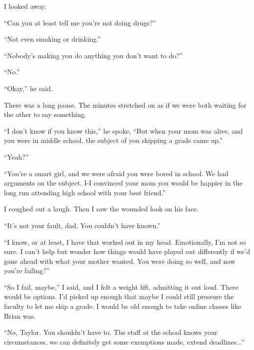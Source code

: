 I looked away.



``Can you at least tell me you're not doing drugs?''



``Not even smoking or drinking.''



``Nobody's making you do anything you don't want to do?''



``No.''



``Okay,'' he said.



There was a long pause.  The minutes stretched on as if we were both waiting for the other to say something.



``I don't know if you know this,'' he spoke, ``But when your mom was alive, and you were in middle school, the subject of you skipping a grade came up.''



``Yeah?''



``You're a smart girl, and we were afraid you were bored in school.  We had arguments on the subject.  I-I convinced your mom you would be happier in the long run attending high school with your best friend.''



I coughed out a laugh.  Then I saw the wounded look on his face.



``It's not your fault, dad.  You couldn't have known.''



``I know, or at least, I have that worked out in my head.  Emotionally, I'm not so sure.  I can't help but wonder how things would have played out differently if we'd gone ahead with what your mother wanted.  You were doing so well, and now you're failing?''



``So I fail, maybe,'' I said, and I felt a weight lift, admitting it out loud.  There would be options.  I'd picked up enough that maybe I could still pressure the faculty to let me skip a grade.  I would be old enough to take online classes like Brian was.



``No, Taylor.  You shouldn't have to.  The staff at the school knows your circumstances, we can definitely get some exemptions made, extend deadlines\ldots''



